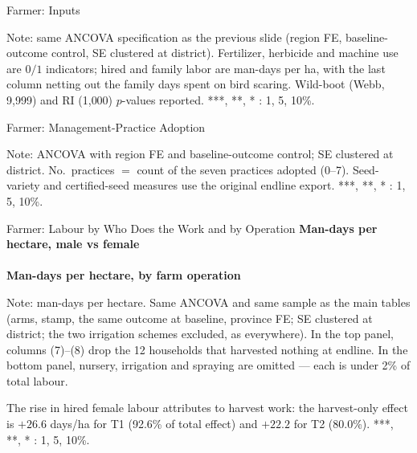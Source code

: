 \documentclass[aspectratio=169]{beamer}
\newcommand{\notefont}{\fontsize{5pt}{6pt}\selectfont}
\begin{document}
\begin{frame}{Farmer: Inputs}
	\centering
	\begin{minipage}{0.94\textwidth}
		\notefont
		Note: same ANCOVA specification as the previous slide (region FE,
		baseline-outcome control, SE clustered at district). Fertilizer, herbicide and machine
		use are $0/1$ indicators; hired and family labor are man-days per ha, with the last
		column netting out the family days spent on bird scaring. Wild-boot (Webb, 9{,}999)
		and RI (1{,}000) $p$-values reported. ***, **, * : 1, 5, 10\%.
	\end{minipage}
\end{frame}

\begin{frame}{Farmer: Management-Practice Adoption}
	\centering
	\begin{minipage}{0.94\textwidth}
		\notefont
		Note: ANCOVA with region FE and baseline-outcome control; SE clustered at district.
		No.\ practices $=$ count of the seven practices adopted (0--7). Seed-variety and
		certified-seed measures use the original endline export. ***, **, * : 1, 5, 10\%.
	\end{minipage}
\end{frame}

\begin{frame}{Farmer: Labour by Who Does the Work and by Operation}
	\centering
	{\notefont\textbf{Man-days per hectare, male vs female}}\\[1pt]
	\\[4pt]
	{\notefont\textbf{Man-days per hectare, by farm operation}}\\[1pt]
	\begin{minipage}{0.94\textwidth}
		\notefont
		Note: man-days per hectare. Same ANCOVA and same sample as the main tables (arms, stamp,
		the same outcome at baseline, province FE; SE clustered at district; the two
		irrigation schemes excluded, as everywhere). 
		In the top panel, columns (7)--(8) drop the 12 households that
		harvested nothing at endline. In the bottom panel, nursery, irrigation and spraying are
		omitted --- each is under 2\% of total labour.
		\par The rise in hired female labour attributes to harvest work: the
		harvest-only effect is $+26.6$ days/ha for T1 (92.6\% of total effect) and $+22.2$ for T2 (80.0\%).
		***, **, * : 1, 5, 10\%.
	\end{minipage}
\end{frame}
\end{document}
